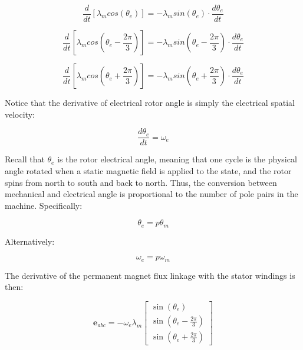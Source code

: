 \documentclass{article}
\begin{document}
\begin{equation}
    \frac{d}{dt} \left[ \lambda_{m}cos(\theta_e) \right] = -\lambda_m sin(\theta_e) \cdot \frac{d\theta_e}{dt}
\end{equation}

\begin{equation}
    \frac{d}{dt} \left[ \lambda_{m}cos(\theta_e - \frac{2\pi}{3}) \right] = -\lambda_m sin(\theta_e - \frac{2\pi}{3}) \cdot \frac{d\theta_e}{dt}
\end{equation}

\begin{equation}
    \frac{d}{dt} \left[ \lambda_{m}cos(\theta_e + \frac{2\pi}{3}) \right] = -\lambda_m sin(\theta_e + \frac{2\pi}{3}) \cdot \frac{d\theta_e}{dt}
\end{equation}

Notice that the derivative of electrical rotor angle is simply the electrical spatial velocity:

\begin{equation}
    \frac{d\theta_e}{dt} = \omega_e
\end{equation}

Recall that $\theta_e$ is the rotor electrical angle, meaning that one cycle is the physical angle rotated when a static magnetic field is applied to the state, and the rotor spins from north to south and back to north. Thus, the conversion between mechanical and electrical angle is proportional to the number of pole pairs in the machine. Specifically:

\begin{equation}
    \theta_e = p\theta_m
\end{equation}

Alternatively:

\begin{equation}
    \omega_e = p\omega_m
\end{equation}

The derivative of the permanent magnet flux linkage with the stator windings is then:

\begin{equation}
    \boldsymbol{e}_{abc} = -\omega_e\lambda_m
    \begin{bmatrix}
        \sin(\theta_e) \\[4pt]
        \sin\left(\theta_e-\frac{2\pi}{3}\right) \\[4pt]
        \sin\left(\theta_e+\frac{2\pi}{3}\right)
    \end{bmatrix}
\end{equation}
\end{document}
